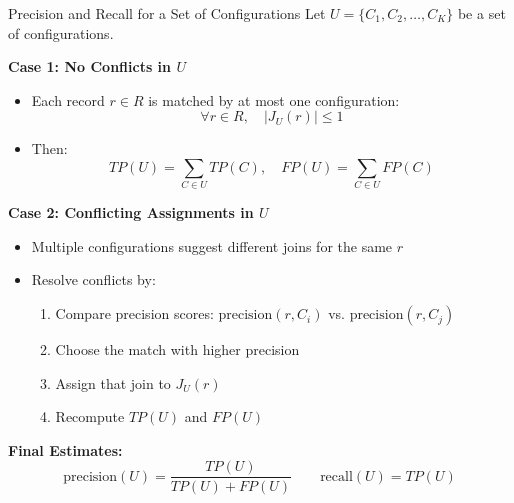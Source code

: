 \documentclass[8pt]{beamer} %
\begin{document}
\begin{frame}{Precision and Recall for a Set of Configurations}
	Let $U = \{C_1, C_2, \dots, C_K\}$ be a set of configurations.
	
	\vspace{0.5em}
	\textbf{Case 1: No Conflicts in $U$}
	\begin{itemize}
		\item Each record $r \in R$ is matched by at most one configuration:
		$$
		\forall r \in R, \quad |J_U(r)| \leq 1
		$$
		\item Then:
		$$
		TP(U) = \sum_{C \in U} TP(C), \quad
		FP(U) = \sum_{C \in U} FP(C)
		$$
	\end{itemize}
	
	\vspace{0.5em}
	\textbf{Case 2: Conflicting Assignments in $U$}
	\begin{itemize}
		\item Multiple configurations suggest different joins for the same $r$
		\item Resolve conflicts by:
		\begin{enumerate}
			\item Compare precision scores: $\text{precision}(r, C_i)$ vs. $\text{precision}(r, C_j)$
			\item Choose the match with higher precision
			\item Assign that join to $J_U(r)$
			\item Recompute $TP(U)$ and $FP(U)$
		\end{enumerate}
	\end{itemize}
	
	\textbf{Final Estimates:}
	$$
	\text{precision}(U) = \frac{TP(U)}{TP(U) + FP(U)} \qquad
	\text{recall}(U) = TP(U)
	$$
\end{frame}
\end{document}
